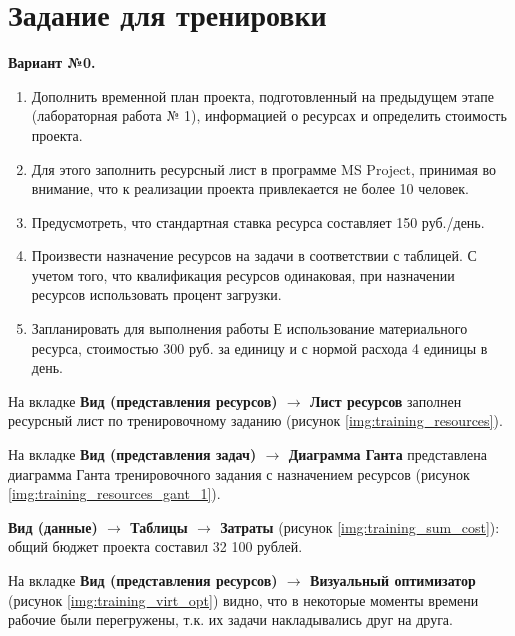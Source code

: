 \chapter{Задание для тренировки}

\textbf{Вариант №0.}

\begin{enumerate}
    \item Дополнить временной план проекта, подготовленный на предыдущем этапе
    (лабораторная работа № 1), информацией о ресурсах и определить стоимость 
    проекта.
    \item Для этого заполнить ресурсный лист в программе MS Project, принимая во
    внимание, что к реализации проекта привлекается не более 10 человек.
    \item Предусмотреть, что стандартная ставка ресурса составляет 150 руб./день.
    \item Произвести назначение ресурсов на задачи в соответствии с таблицей. С учетом 
    того, что квалификация ресурсов одинаковая, при назначении ресурсов 
    использовать процент загрузки.
    \item Запланировать для выполнения работы Е использование материального ресурса, 
    стоимостью 300 руб. за единицу и с нормой расхода 4 единицы в день.
\end{enumerate}

На вкладке \textbf{Вид (представления ресурсов) $ \rightarrow $ Лист ресурсов} заполнен ресурсный лист по тренировочному заданию (рисунок \ref{img:training_resources}).

На вкладке \textbf{Вид (представления задач) $ \rightarrow $ Диаграмма Ганта} представлена диаграмма Ганта тренировочного задания с назначением ресурсов (рисунок \ref{img:training_resources_gant_1}).

\textbf{Вид (данные) $ \rightarrow $ Таблицы $ \rightarrow $ Затраты} (рисунок \ref{img:training_sum_cost}): общий бюджет проекта составил 32 100 рублей.

На вкладке \textbf{Вид (представления ресурсов) $ \rightarrow $ Визуальный оптимизатор} (рисунок \ref{img:training_virt_opt}) видно, что в некоторые моменты времени рабочие были перегружены, т.к. их задачи накладывались друг на друга.
